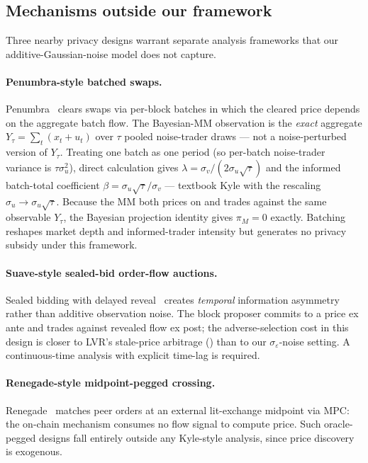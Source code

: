 \documentclass[runningheads]{llncs}
\newcommand{\sigv}{\sigma_v}
\newcommand{\sigu}{\sigma_u}
\newcommand{\sige}{\sigma_\varepsilon}
\begin{document}
\subsection{Mechanisms outside our framework}
\label{ssec:outside}

Three nearby privacy designs warrant separate analysis frameworks
that our additive-Gaussian-noise model does not capture.

\paragraph{Penumbra-style batched swaps.}
Penumbra~\cite{penumbra-docs} clears swaps via per-block batches
in which the cleared price depends on the aggregate batch flow.
The Bayesian-MM observation is the \emph{exact} aggregate
$Y_\tau = \sum_t (x_t + u_t)$ over $\tau$ pooled noise-trader
draws --- not a noise-perturbed version of $Y_\tau$. Treating one
batch as one period (so per-batch noise-trader variance is
$\tau\sigu^2$), direct calculation gives $\lambda =
\sigv/(2\sigu\sqrt{\tau})$ and the informed batch-total
coefficient $\beta = \sigu\sqrt{\tau}/\sigv$ --- textbook Kyle
with the rescaling $\sigu \to \sigu\sqrt{\tau}$. Because the MM
both prices on and trades against the same observable $Y_\tau$,
the Bayesian projection identity gives $\pi_M = 0$ exactly.
Batching reshapes market depth and informed-trader intensity but
generates no privacy subsidy under this framework.

\paragraph{Suave-style sealed-bid order-flow auctions.}
Sealed bidding with delayed reveal~\cite{flashbots-suave}
creates \emph{temporal} information asymmetry rather than
additive observation noise. The block proposer commits to a
price ex ante and trades against revealed flow ex post; the
adverse-selection cost in this design is closer to LVR's
stale-price arbitrage () than to our $\sige$-noise
setting. A continuous-time analysis with explicit time-lag is
required.

\paragraph{Renegade-style midpoint-pegged crossing.}
Renegade~\cite{renegade-wp} matches peer orders at an external
lit-exchange midpoint via MPC: the on-chain mechanism consumes
no flow signal to compute price. Such oracle-pegged designs fall
entirely outside any Kyle-style analysis, since price discovery
is exogenous.
\end{document}
